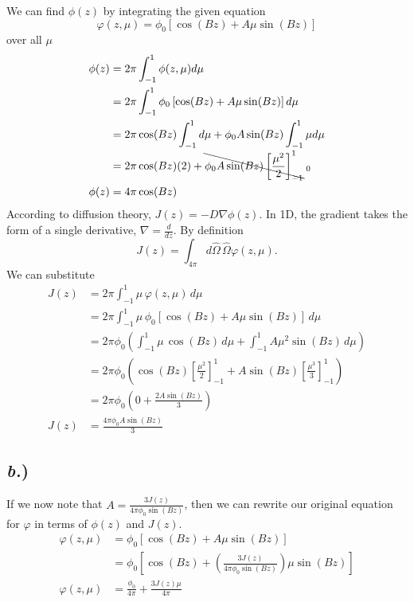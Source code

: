 \documentclass{article}
\begin{document}
We can find $\phi(z)$ by integrating the given equation 
$$ \varphi(z,\mu) = \phi_0 \left[\cos(Bz) + A \mu \sin(Bz)\right] $$
over all $\mu$
\begin{align*}
\phi(z)	&= 2\pi \int_{-1}^{1} \phi(z,\mu) d\mu \\
		&= 2\pi \int_{-1}^{1} \phi_0\left[\cos(Bz) + A \mu \sin(Bz)\right] d\mu \\
		&= 2\pi \cos(Bz) \int_{-1}^{1} d\mu + \phi_0 A \sin(Bz) \int_{-1}^{1} \mu d\mu\\
		&= 2\pi \cos(Bz) (2) + \bcancel{\phi_0 A \sin(Bz) \left[ \frac{\mu^2}{2} \right]_{-1}^{1}}_{\;0}\\
\phi(z)	&= 4\pi \cos(Bz)
\end{align*}
According to diffusion theory, $J(z) = -D \nabla \phi(z)$. In 1D, the gradient takes the form of a single derivative, $\nabla = \frac{d}{dz}$. By definition 
$$ J(z) = \int_{4\pi} d\hat{\Omega} \, \hat{\Omega} \varphi(z,\mu).$$
We can substitute 
\begin{align*}
J(z)	&= 2\pi \int_{-1}^{1} \mu \, \varphi(z,\mu) \, d\mu \\
		&= 2\pi \int_{-1}^{1} \mu \, \phi_0 \left[\cos(Bz) + A \mu \sin(Bz)\right] \, d\mu \\
		&= 2\pi\phi_0 \left( \int_{-1}^{1} \mu \, \cos(Bz) \, d\mu + \int_{-1}^{1} A \mu^2 \sin(Bz) \, d\mu \right) \\
		&= 2\pi\phi_0 \left( \cos(Bz) \left[\frac{\mu^2}{2} \right]_{-1}^{1} + A \sin(Bz) \left[ \frac{\mu^3}{3} \right]_{-1}^{1} \right) \\
		&= 2\pi\phi_0 \left( 0 + \frac{2A\sin(Bz)}{3} \right) \\
J(z)	&= \frac{4\pi\phi_0A\sin(Bz)}{3}
\end{align*}


\subsection*{\textit{b.})}

If we now note that $A = \frac{3J(z)}{4\pi\phi_0\sin(Bz)}$, then we can rewrite our original equation for $\varphi$ in terms of $\phi(z)$ and $J(z)$.
\begin{align*}
\varphi(z,\mu)	&= \phi_0 \left[\cos(Bz) + A \mu \sin(Bz)\right] \\
				&= \phi_0 \left[\cos(Bz) + \left(\frac{3J(z)}{4\pi\phi_0\sin(Bz)}\right) \mu \sin(Bz)\right]\\
\varphi(z,\mu)	&= \frac{\phi_0}{4\pi} + \frac{3J(z)\mu}{4\pi}
\end{align*}
\end{document}
